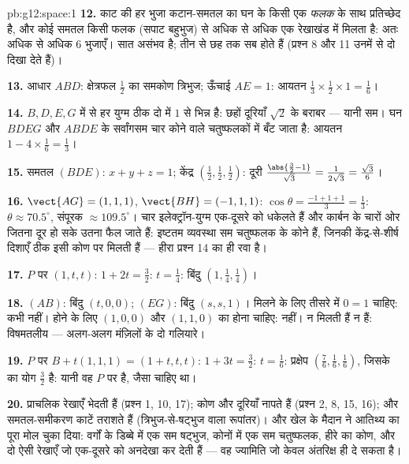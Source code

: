 \begin{solution}{pb:g12:space:1}
\textbf{12.} काट की हर भुजा कटान-समतल का घन के किसी एक \emph{फलक} के साथ
प्रतिच्छेद है, और कोई समतल किसी फलक (सपाट बहुभुज) से अधिक से अधिक एक रेखाखंड
में मिलता है: अतः अधिक से अधिक $6$ भुजाएँ। सात असंभव है; तीन से छह तक सब
होते हैं (प्रश्न 8 और 11 उनमें से दो दिखा देते हैं)।

\textbf{13.} आधार $ABD$: क्षेत्रफल $\frac12$ का समकोण त्रिभुज; ऊँचाई $AE = 1$: आयतन
$\frac13 \times \frac12 \times 1 = \frac16$।

\textbf{14.} $B, D, E, G$ में से हर युग्म ठीक दो  में $1$ से भिन्न है:
छहों दूरियाँ $\sqrt2$ के बराबर --- यानी सम। घन $BDEG$ और $ABDE$ के सर्वांगसम चार
कोने वाले चतुष्फलकों में बँट जाता है: आयतन $1 - 4 \times \frac16 = \frac13$।

\textbf{15.} समतल $(BDE)$: $x + y + z = 1$; केंद्र $\left(\frac12,\frac12,\frac12\right)$: दूरी $\frac{\abs{\frac32 - 1}}{\sqrt3} = \frac{1}{2\sqrt3} =
\frac{\sqrt3}{6}$।

\textbf{16.} $\vect{AG} = (1,1,1)$, $\vect{BH} = (-1,1,1)$: $\cos\theta = \frac{-1 + 1 + 1}{3} =
\frac13$: $\theta \approx 70.5^\circ$, संपूरक $\approx 109.5^\circ$। चार इलेक्ट्रॉन-युग्म
एक-दूसरे को धकेलते हैं और कार्बन के चारों ओर जितना दूर हो सके उतना फैल जाते
हैं: इष्टतम व्यवस्था सम चतुष्फलक के कोने हैं, जिनकी केंद्र-से-शीर्ष दिशाएँ
ठीक इसी कोण पर मिलती हैं --- हीरा प्रश्न 14 का ही रवा है।

\textbf{17.} $P$ पर $(1, t, t)$: $1 + 2t = \frac32$: $t = \frac14$: बिंदु $\left(1, \frac14, \frac14\right)$।

\textbf{18.} $(AB)$: बिंदु $(t, 0, 0)$; $(EG)$: बिंदु $(s, s, 1)$। मिलने के लिए तीसरे
 में $0 = 1$ चाहिए: कभी नहीं।  होने के लिए $(1,0,0)$ और $(1,1,0)$ का
 होना चाहिए: नहीं। न मिलती हैं न  हैं: विषमतलीय --- अलग-अलग मंज़िलों
के दो गलियारे।

\textbf{19.} $P$ पर $B + t(1,1,1) = (1 + t, t, t)$: $1 + 3t = \frac32$: $t = \frac16$: प्रक्षेप $\left(\frac76, \frac16, \frac16\right)$, जिसके 
का योग $\frac32$ है: यानी वह $P$ पर है, जैसा चाहिए था।

\textbf{20.} प्राचलिक रेखाएँ भेदती हैं (प्रश्न 1, 10, 17);  कोण
और दूरियाँ नापते हैं (प्रश्न 2, 8, 15, 16); और समतल-समीकरण काटें तराशते हैं
(त्रिभुज-से-षट्भुज वाला रूपांतर)। और खेल के मैदान ने आतिथ्य का पूरा मोल चुका
दिया: वर्गों के डिब्बे में एक सम षट्भुज, कोनों में एक सम चतुष्फलक, हीरे का
कोण, और दो ऐसी रेखाएँ जो एक-दूसरे को अनदेखा कर देती हैं --- वह ज्यामिति जो
केवल अंतरिक्ष ही दे सकता है।
\end{solution}
